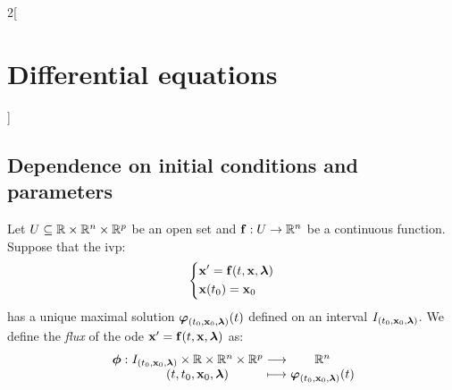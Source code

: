 \documentclass[../../../main.tex]{subfiles}
\begin{document}
\begin{multicols}{2}[\section{Differential equations}]
    \subsection{Dependence on initial conditions and parameters}
    \begin{definition}
        Let $U\subseteq\mathbb{R}\times\mathbb{R}^n\times\mathbb{R}^p$ be an open set and $\boldsymbol{\mathrm{f}}:U\rightarrow\mathbb{R}^n$ be a continuous function. Suppose that the ivp:
        \begin{equation}\label{DE_ivp_lambda}
            \left\{
            \begin{aligned}
                 & \boldsymbol{\mathrm{x}}'      =\boldsymbol{\mathrm{f}}(t,\boldsymbol{\mathrm{x}},\boldsymbol{\mathrm{\lambda}}) \\
                 & \boldsymbol{\mathrm{x}}(t_0)  =\boldsymbol{\mathrm{x}}_0
            \end{aligned}
            \right.
        \end{equation}
        has a unique maximal solution $\boldsymbol{\mathrm{\varphi}}_{(t_0,\boldsymbol{\mathrm{x}}_0,\boldsymbol{\mathrm{\lambda}})}(t)$ defined on an interval $I_{(t_0,\boldsymbol{\mathrm{x}}_0,\boldsymbol{\mathrm{\lambda}})}$. We define the \textit{flux} of the ode $\boldsymbol{\mathrm{x}}'=\boldsymbol{\mathrm{f}}(t,\boldsymbol{\mathrm{x}},\boldsymbol{\mathrm{\lambda}})$ as: $$\function{\vf{\phi}}{I_{(t_0,\vf{x}_0,\vf{\lambda})}\times\RR\times\RR^n\times\RR^p}{\RR^n}{(t,t_0,\vf{x}_0,\vf{\lambda})}{\vf{\varphi}_{(t_0,\vf{x}_0,\vf{\lambda})}(t)}$$
    \end{definition}

\end{multicols}
\end{document}
